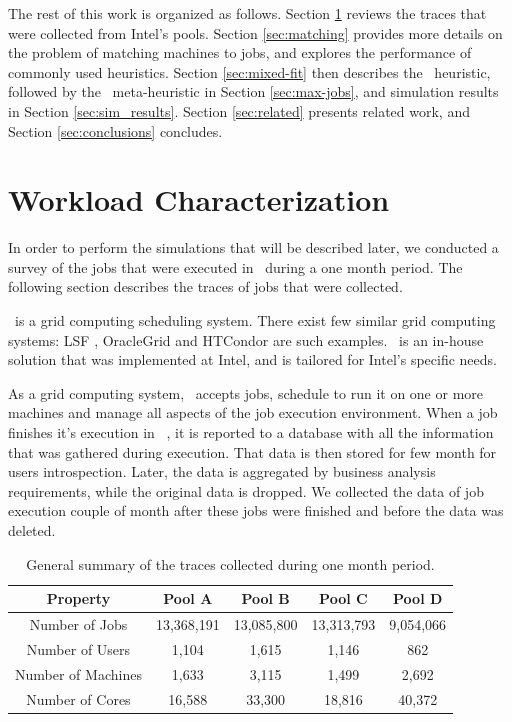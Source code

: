 The rest of this work is organized as follows.
Section \ref{sec:traces} reviews the traces that were collected from Intel's pools.
Section \ref{sec:matching} provides more details on the problem of
matching machines to jobs, and explores the performance of commonly
used heuristics.
Section \ref{sec:mixed-fit} then describes the \mif\ heuristic,
followed by the \maj\ meta-heuristic in Section \ref{sec:max-jobs},
and simulation results in Section \ref{sec:sim_results}.
Section \ref{sec:related} presents related work, and Section
\ref{sec:conclusions} concludes.

\chapter{Workload Characterization}
\label{sec:traces}
In order to perform the simulations that will be described later, 
we conducted a survey of the jobs that were executed in \nb\ during a one month period.
The following section describes the traces of jobs that were collected.

\nb\ is a grid computing scheduling system. 
There exist few similar grid computing systems: LSF \cite{platformlsf}, OracleGrid \cite{oracleGridEngine} and HTCondor \cite{htcondor} 
are such examples.
\nb\ is an in-house solution that was implemented at Intel, and is tailored 
for Intel's specific needs.

As a grid computing system, \nb\ accepts jobs, 
schedule to run it on one or more machines and manage all aspects of the job 
execution environment.
When a job finishes it's execution in \nb\ , it is reported to a database 
with all the information that was gathered during execution.
That data is then stored for few month for users introspection. Later, the data is 
aggregated by business analysis requirements, while the original data is dropped.
We collected the data of job execution couple of month after these jobs were finished 
and before the data was deleted.

\begin{table}\centering
\begin{tabular}{|c|c|c|c|c|}

\hline 
Property & Pool A & Pool B & Pool C & Pool D\tabularnewline
\hline 
Number of Jobs & 13,368,191 & 13,085,800 & 13,313,793 & 9,054,066\tabularnewline
\hline 
Number of Users & 1,104 & 1,615 & 1,146 & 862\tabularnewline
\hline 
Number of Machines & 1,633 & 3,115 & 1,499 & 2,692\tabularnewline
\hline 
Number of Cores & 16,588 & 33,300 & 18,816 & 40,372\tabularnewline
\hline 
\end{tabular}
\caption{General summary of the traces collected during one month period.}
\label{tab:jobs_properties}
\end{table}

